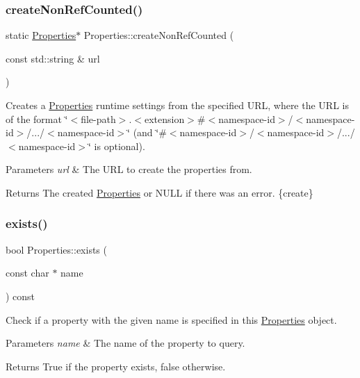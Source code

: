 \subsubsection{\texorpdfstring{create\+Non\+Ref\+Counted()}{createNonRefCounted()}\hspace{0.1cm}{\footnotesize\ttfamily [2/2]}}
{\footnotesize\ttfamily static \hyperlink{classProperties}{Properties}$\ast$ Properties\+::create\+Non\+Ref\+Counted (\begin{DoxyParamCaption}\item[{const std\+::string \&}]{url }\end{DoxyParamCaption})\hspace{0.3cm}{\ttfamily [static]}}

Creates a \hyperlink{classProperties}{Properties} runtime settings from the specified U\+RL, where the U\+RL is of the format \char`\"{}$<$file-\/path$>$.$<$extension$>$\#$<$namespace-\/id$>$/$<$namespace-\/id$>$/.../$<$namespace-\/id$>$\char`\"{} (and \char`\"{}\#$<$namespace-\/id$>$/$<$namespace-\/id$>$/.../$<$namespace-\/id$>$\char`\"{} is optional).


\begin{DoxyParams}{Parameters}
{\em url} & The U\+RL to create the properties from.\\
\hline
\end{DoxyParams}
\begin{DoxyReturn}{Returns}
The created \hyperlink{classProperties}{Properties} or N\+U\+LL if there was an error. \{create\} 
\end{DoxyReturn}
\mbox{\label{classProperties_a4afbc191b79c5994705e85af94045f6a}} 
\subsubsection{\texorpdfstring{exists()}{exists()}\hspace{0.1cm}{\footnotesize\ttfamily [1/2]}}
{\footnotesize\ttfamily bool Properties\+::exists (\begin{DoxyParamCaption}\item[{const char $\ast$}]{name }\end{DoxyParamCaption}) const}

Check if a property with the given name is specified in this \hyperlink{classProperties}{Properties} object.


\begin{DoxyParams}{Parameters}
{\em name} & The name of the property to query.\\
\hline
\end{DoxyParams}
\begin{DoxyReturn}{Returns}
True if the property exists, false otherwise. 
\end{DoxyReturn}
\mbox{\label{classProperties_a4afbc191b79c5994705e85af94045f6a}} 
